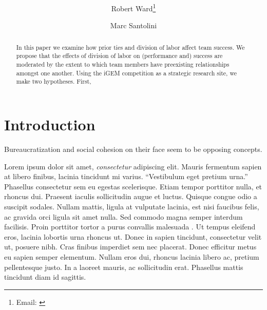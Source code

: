 \documentclass[11pt,letterpaper]{article} %
\begin{document}
	
	\title{\textbf{\papertitle}}
	\author[1,2]{Robert Ward\thanks{Email: \href{mailto:\myemail}{\myemail}}}
	\author[2]{Marc Santolini}
	
	\affil[1]{\myaffiliation}
	
\maketitle
	
	\begin{abstract}
		In this paper we examine how prior ties and division of labor affect team success.  We propose that the effects of division of labor on (performance and) success are moderated by the extent to which team members have preexisting relationships amongst one another.  Using the iGEM competition as a strategic research site, we make two hypotheses.  First, 
	\end{abstract}
	
	\clearpage
	
	\section*{Introduction}
	
	
	
	Bureaucratization and social cohesion on their face seem to be opposing concepts.  \citep{}
	
	
	
	
	Lorem ipsum dolor sit amet, \emph{consectetur} adipiscing elit. Mauris fermentum sapien at libero finibus, lacinia tincidunt mi varius. \enquote{Vestibulum eget pretium urna.} Phasellus consectetur sem eu egestas scelerisque. Etiam tempor porttitor nulla, et rhoncus dui. Praesent iaculis sollicitudin augue et luctus. Quisque congue odio a suscipit sodales. Nullam mattis, ligula at vulputate lacinia, est nisi faucibus felis, ac gravida orci ligula sit amet nulla. Sed commodo magna semper interdum facilisis. Proin porttitor tortor a purus convallis malesuada \citep{leahey_prominent_2017}. Ut tempus eleifend eros, lacinia lobortis urna rhoncus ut. Donec in sapien tincidunt, consectetur velit ut, posuere nibh. Cras finibus imperdiet sem nec placerat. Donec efficitur metus eu sapien semper elementum. Nullam eros dui, rhoncus lacinia libero ac, pretium pellentesque justo. In a laoreet mauris, ac sollicitudin erat. Phasellus mattis tincidunt diam id sagittis.
	
\end{document}
